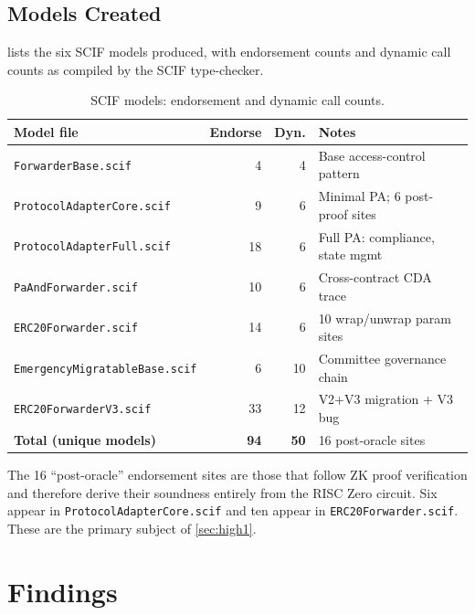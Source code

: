 \documentclass[11pt,a4paper]{article}
\begin{document}
\subsection{Models Created}

 lists the six SCIF models produced, with endorsement counts
and dynamic call counts as compiled by the SCIF type-checker.

\begin{table}[h]
\centering
\caption{SCIF models: endorsement and dynamic call counts.}
\label{tab:models}
\small
\begin{tabular}{@{}lrrl@{}}
\toprule
\textbf{Model file} & \textbf{Endorse} & \textbf{Dyn.} & \textbf{Notes} \\
\midrule
\texttt{ForwarderBase.scif}           & 4  & 4  & Base access-control pattern \\
\texttt{ProtocolAdapterCore.scif}     & 9  & 6  & Minimal PA; 6 post-proof sites \\
\texttt{ProtocolAdapterFull.scif}     & 18 & 6  & Full PA: compliance, state mgmt \\
\texttt{PaAndForwarder.scif}          & 10 & 6  & Cross-contract CDA trace \\
\texttt{ERC20Forwarder.scif}          & 14 & 6  & 10 wrap/unwrap param sites \\
\texttt{EmergencyMigratableBase.scif} & 6  & 10 & Committee governance chain \\
\texttt{ERC20ForwarderV3.scif}        & 33 & 12 & V2+V3 migration + V3 bug \\
\midrule
\textbf{Total (unique models)}        & \textbf{94} & \textbf{50} & 16 post-oracle sites \\
\bottomrule
\end{tabular}
\end{table}

The 16 ``post-oracle'' endorsement sites are those that follow ZK proof
verification and therefore derive their soundness entirely from the RISC Zero
circuit. Six appear in \texttt{ProtocolAdapterCore.scif} and ten appear in
\texttt{ERC20Forwarder.scif}. These are the primary subject of \cref{sec:high1}.

\section{Findings}
\label{sec:findings}
\end{document}
